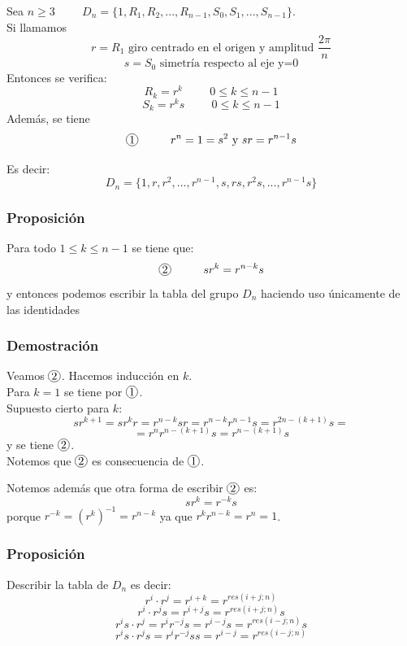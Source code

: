 \documentclass[11pt,a4paper]{article}
\newcommand*{\circled}[2][]{\tikz[baseline=(C.base)]{
	\node[inner sep=0pt] (C) {\vphantom{1g}#2};
	\node[draw, circle, inner sep=1pt, yshift=1pt]
		at (C.center) {\vphantom{1g}};}}
\begin{document}
Sea $n \geq 3 \hspace{1cm} D_{n} = \{1, R_{1}, R_{2}, ..., R_{n-1}, S_{0}, S_{1}, ..., S_{n-1}\}$. \\
Si llamamos
$$r = R_{1} \text{ giro centrado en el origen y amplitud } \frac{2\pi}{n}$$
$$s = S_{0} \text{ simetría respecto al eje y=0}$$
Entonces se verifica:
$$R_{k} = r^{k} \hspace{1cm} 0 \leq k \leq n-1$$
$$S_{k} = r^{k}s \hspace{1cm} 0 \leq k \leq n-1$$
Además, se tiene 
$$\circled{1} \hspace{1cm} r^{n} = 1 = s^{2} \text{ y } sr = r^{n-1}s$$

Es decir:
$$D_{n} = \{1, r, r^{2}, ..., r^{n-1}, s, rs, r^{2}s, ..., r^{n-1}s\}$$

\subsubsection*{Proposición}

Para todo $1 \leq k \leq n-1$ se tiene que:
$$\circled{2} \hspace{1cm} sr^{k} = r^{n-k}s$$
y entonces podemos escribir la tabla del grupo $D_{n}$ haciendo uso únicamente de las identidades

\subsubsection*{Demostración}

Veamos $\circled{2}$. Hacemos inducción en $k$. \\
Para $k = 1$ se tiene por $\circled{1}$. \\
Supuesto cierto para $k$:
$$sr^{k+1} = sr^{k}r = r^{n-k}sr = r^{n-k}r^{n-1}s = r^{2n-(k+1)}s =$$ $$=r^{n}r^{n-(k+1)}s = r^{n-(k+1)}s$$
y se tiene $\circled{2}$. \\
Notemos que $\circled{2}$ es consecuencia de $\circled{1}$.

Notemos además que otra forma de escribir $\circled{2}$ es:
$$sr^{k} = r^{-k}s$$
porque $r^{-k} = (r^{k})^{-1} = r^{n-k}$ ya que $r^{k}r^{n-k} = r^{n} = 1$.

\subsubsection*{Proposición}

Describir la tabla de $D_{n}$ es decir:
$$r^{i} \cdot r^{j} = r^{i+k} = r^{res(i+j;n)}$$
$$r^{i} \cdot r^{j}s = r^{i+j}s = r^{res(i+j;n)}s$$
$$r^{i}s \cdot r^{j} = r^{i}r^{-j}s = r^{i-j}s = r^{res(i-j;n)}s$$
$$r^{i}s \cdot r^{j}s = r^{i}r^{-j}ss = r^{i-j} = r^{res(i-j;n)} $$
\end{document}
